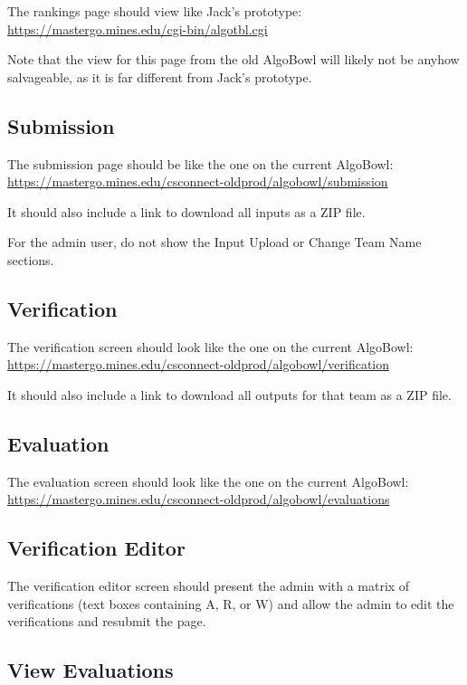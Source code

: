 \documentclass[12pt]{article}
\begin{document}
The rankings page should view like Jack's prototype: \\
\url{https://mastergo.mines.edu/cgi-bin/algotbl.cgi}

Note that the view for this page from the old AlgoBowl will likely not be
anyhow salvageable, as it is far different from Jack's prototype.

\subsection{Submission}

The submission page should be like the one on the current AlgoBowl: \\
\url{https://mastergo.mines.edu/csconnect-oldprod/algobowl/submission}

It should also include a link to download all inputs as a ZIP file.

For the admin user, do not show the Input Upload or Change Team Name sections.

\subsection{Verification}

The verification screen should look like the one on the current AlgoBowl: \\
\url{https://mastergo.mines.edu/csconnect-oldprod/algobowl/verification}

It should also include a link to download all outputs for that team as a ZIP
file.

\subsection{Evaluation}

The evaluation screen should look like the one on the current AlgoBowl: \\
\url{https://mastergo.mines.edu/csconnect-oldprod/algobowl/evaluations}

\subsection{Verification Editor}

The verification editor screen should present the admin with a matrix of
verifications (text boxes containing A, R, or W) and allow the admin to edit
the verifications and resubmit the page.

\subsection{View Evaluations}
\end{document}
